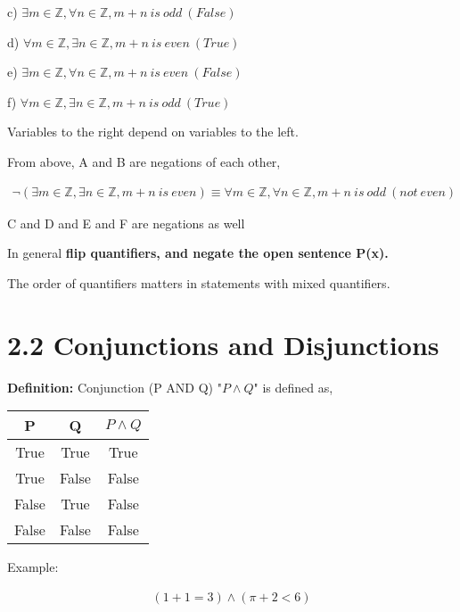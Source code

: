 \documentclass[11pt]{article}
\begin{document}
c) $\exists m \in \mathbb{Z}, \forall n \in \mathbb{Z}, m+n\ is\ odd\ (False)$

d) $\forall m \in \mathbb{Z}, \exists n \in \mathbb{Z}, m+n\ is\ even\ (True)$

e) $\exists m \in \mathbb{Z}, \forall n \in \mathbb{Z}, m+n\ is\ even\ (False)$

f) $\forall m \in \mathbb{Z}, \exists n \in \mathbb{Z}, m+n\ is\ odd\ (True)$

Variables to the right depend on variables to the left.

From above, A and B are negations of each other,

\begin{align*}
    \neg(\exists m \in \mathbb{Z}, \exists n \in \mathbb{Z}, m+n\ is\ even) \equiv \forall m \in \mathbb{Z}, \forall n \in \mathbb{Z}, m+n\ is\ odd\ (not\ even)
\end{align*}

C and D and E and F are negations as well

In general \textbf{flip quantifiers, and negate the open sentence P(x).}

The order of quantifiers matters in statements with mixed quantifiers.

\section*{2.2 Conjunctions and Disjunctions}

\textbf{Definition: }Conjunction (P AND Q) "$P \wedge Q$" is defined as,

\begin{center}
    \begin{tabular}{ |c|c|c| } 
        \hline
        P & Q & $P \wedge Q$ \\ 
        \hline
        True & True & True \\ 
        True & False & False \\
        False & True & False \\
        False & False & False \\ 
        \hline
    \end{tabular}
\end{center}

Example:

\begin{align*}
    (1+1 = 3)\wedge(\pi + 2 < 6)
\end{align*}
\end{document}
